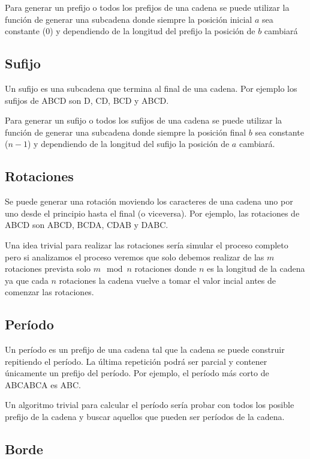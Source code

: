 Para generar un prefijo o todos los prefijos de una cadena se puede utilizar la función de generar una subcadena donde siempre la posición inicial $a$ sea constante ($0$) y dependiendo de la longitud del prefijo la posición de $b$ cambiará

\subsection{Sufijo}
Un sufijo es una subcadena que termina al final de una cadena. Por ejemplo los sufijos de ABCD son D, CD, BCD y ABCD.  

Para generar un sufijo o todos los sufijos de una cadena se puede utilizar la función de generar una subcadena donde siempre la posición final $b$ sea constante ($n-1$) y dependiendo de la longitud del sufijo la posición de $a$ cambiará.

\subsection{Rotaciones}
Se puede generar una rotación moviendo los caracteres de una cadena uno por uno desde el principio hasta el final (o viceversa). Por ejemplo, las rotaciones de ABCD son ABCD, BCDA, CDAB y DABC.

Una idea trivial para realizar las rotaciones sería simular el proceso completo pero si analizamos el proceso veremos que solo debemos realizar de las $m$ rotaciones prevista solo $ m \mod n $ rotaciones donde $n$ es la longitud de la cadena ya que cada $n$ rotaciones la cadena vuelve a tomar el valor incial antes de comenzar las rotaciones. 

\subsection{Período}

Un período es un prefijo de una cadena tal que la cadena se puede construir repitiendo el período. La última repetición podrá ser parcial y contener únicamente un prefijo del período. Por ejemplo, el período más corto de ABCABCA es ABC.

Un algoritmo trivial para calcular el período sería probar con todos los posible prefijo de la cadena y buscar aquellos que pueden ser períodos de la cadena.

\subsection{Borde}

